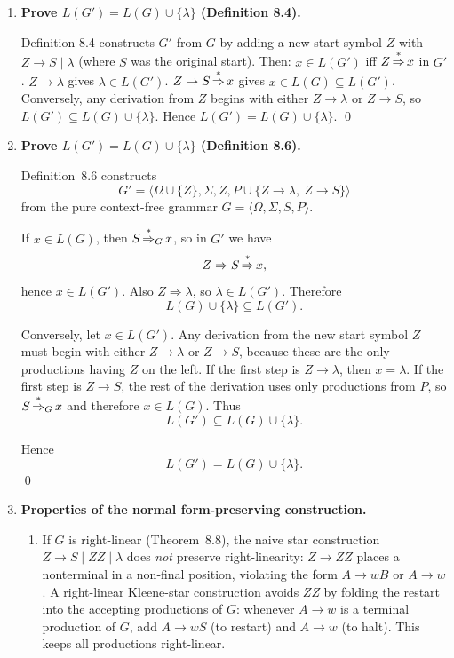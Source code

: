 \begin{enumerate}[{8.}1. ]
\item \textbf{Prove $L(G') = L(G) \cup \{\lambda\}$ (Definition 8.4).}

Definition 8.4 constructs $G'$ from $G$ by adding a new start symbol $Z$ with $Z \to S \mid \lambda$ (where $S$ was the original start). Then:
$x \in L(G')$ iff $Z \operatorname{\overset{*}{\Rightarrow}} x$ in $G'$.
$Z \to \lambda$ gives $\lambda \in L(G')$.
$Z \to S \operatorname{\overset{*}{\Rightarrow}} x$ gives $x \in L(G) \subseteq L(G')$.
Conversely, any derivation from $Z$ begins with either $Z \to \lambda$ or $Z \to S$, so $L(G') \subseteq L(G) \cup \{\lambda\}$.
Hence $L(G') = L(G) \cup \{\lambda\}$. \qed

\item \textbf{Prove $L(G') = L(G) \cup \{\lambda\}$ (Definition 8.6).}

Definition~8.6 constructs
\[
G'=\langle\Omega\cup\{Z\},\Sigma,Z,P\cup\{Z\to\lambda,\ Z\to S\}\rangle
\]
from the pure context-free grammar $G=\langle\Omega,\Sigma,S,P\rangle$.

If $x\in L(G)$, then $S\operatorname{\overset{*}{\Rightarrow}}_G x$, so in $G'$ we have
\[
Z\Rightarrow S\operatorname{\overset{*}{\Rightarrow}} x,
\]
hence $x\in L(G')$.  Also $Z\Rightarrow\lambda$, so
$\lambda\in L(G')$.  Therefore
\[
L(G)\cup\{\lambda\}\subseteq L(G').
\]

Conversely, let $x\in L(G')$.  Any derivation from the new start symbol $Z$
must begin with either $Z\to\lambda$ or $Z\to S$, because these are the only
productions having $Z$ on the left.  If the first step is $Z\to\lambda$, then
$x=\lambda$.  If the first step is $Z\to S$, the rest of the derivation uses
only productions from $P$, so $S\operatorname{\overset{*}{\Rightarrow}}_G x$ and therefore $x\in L(G)$.
Thus
\[
L(G')\subseteq L(G)\cup\{\lambda\}.
\]

Hence
\[
L(G')=L(G)\cup\{\lambda\}.
\]
\qed

\item \textbf{Properties of the normal form-preserving construction.}

\begin{enumerate}
\item If $G$ is right-linear (Theorem~8.8), the naive star construction $Z \to S \mid ZZ \mid \lambda$ does \emph{not} preserve right-linearity: $Z \to ZZ$ places a nonterminal in a non-final position, violating the form $A \to wB$ or $A \to w$.
A right-linear Kleene-star construction avoids $ZZ$ by folding the restart into the accepting productions of $G$: whenever $A \to w$ is a terminal production of $G$, add $A \to wS$ (to restart) and $A \to w$ (to halt). This keeps all productions right-linear.


\end{enumerate}
\end{enumerate}
